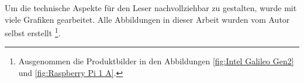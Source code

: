 \par
Um die technische Aspekte für den Leser nachvollziehbar zu gestalten, wurde mit viele Grafiken gearbeitet. Alle Abbildungen in dieser Arbeit wurden vom Autor selbst erstellt \footnote{Ausgenommen die Produktbilder in den Abbildungen \ref{fig:Intel Galileo Gen2} und \ref{fig:Raspberry Pi 1 A}.}. 












\begin{comment}

In der heutigen Zeit ist die nachhaltige Produktion von Energie und ein schonender Umgang mit dieser Ressource ein wichtiges Anliegen der Öffentlichkeit. Speziell die IT-Branche ist von einem grossen Wachstum geprägt. Immer mehr Tätigkeiten werden automatisiert und bestehende Systeme ausgebaut. Dies verursacht einen immer grösseren Stromverbrauch im IT-Bereich. Ein Ziel der Energiepolitik 2050 ist die Senkung des immer weiter steigenden Energieverbrauchs.
\par
Um in der IT-Branche Energie zu sparen, können verschiedene Ansätze gewählt werden. Beispielsweise besteht die Möglichkeit bei Inaktivität automatisch in den Ruhemodus zu wechseln oder die Prozessoren durch sogenannte Sparmodi, insbesondere dynamische Taktfrequenzen oder das kurzzeitige Ein- und Ausschalten der Rechnereinheit, zu optimieren. Diese Sparansätze zielen jeweils nur auf den Hard- oder Softwarebereich ab. Sie berücksichtigen jedoch nicht die besondere Funktionsweise eines jeden Computers, wo die Software die Hardware, also ein Programm einen Prozessor, ansteuert. Anders im Rahmen dieser Arbeit, in welcher das Sparpotenzial bereichsübergreifend erforscht wird.



\section{Übersicht}


\end{comment}
